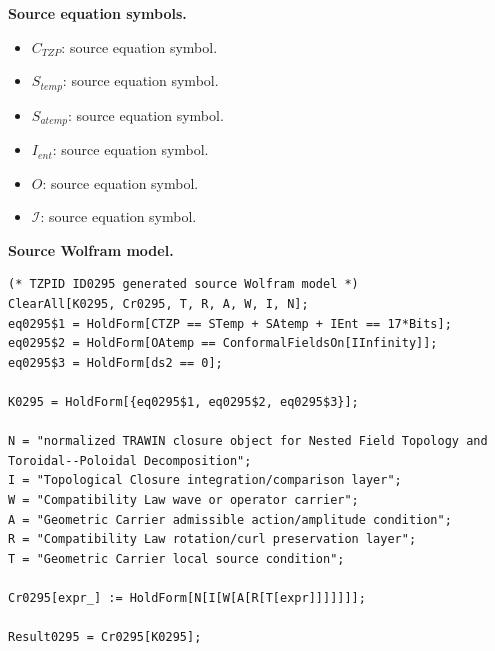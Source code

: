 \begin{minipage}[t]{0.49\linewidth}
\begingroup
\small
\raggedright
\textbf{Source equation symbols.}\par
\begin{itemize}[leftmargin=1.35em,itemsep=1pt,topsep=1pt,parsep=0pt]
    \item $C_{TZP}$: source equation symbol.
    \item $S_{temp}$: source equation symbol.
    \item $S_{atemp}$: source equation symbol.
    \item $I_{ent}$: source equation symbol.
    \item $O$: source equation symbol.
    \item $\mathcal{I}$: source equation symbol.
\end{itemize}
\endgroup
\end{minipage}\hfill
\begin{minipage}[t]{0.47\linewidth}
\begingroup
\scriptsize
\raggedright
\textbf{Source Wolfram model.}\par
\begin{Verbatim}[fontsize=\tiny,breaklines=true,breakanywhere=true]
(* TZPID ID0295 generated source Wolfram model *)
ClearAll[K0295, Cr0295, T, R, A, W, I, N];
eq0295$1 = HoldForm[CTZP == STemp + SAtemp + IEnt == 17*Bits];
eq0295$2 = HoldForm[OAtemp == ConformalFieldsOn[IInfinity]];
eq0295$3 = HoldForm[ds2 == 0];

K0295 = HoldForm[{eq0295$1, eq0295$2, eq0295$3}];

N = "normalized TRAWIN closure object for Nested Field Topology and Toroidal--Poloidal Decomposition";
I = "Topological Closure integration/comparison layer";
W = "Compatibility Law wave or operator carrier";
A = "Geometric Carrier admissible action/amplitude condition";
R = "Compatibility Law rotation/curl preservation layer";
T = "Geometric Carrier local source condition";

Cr0295[expr_] := HoldForm[N[I[W[A[R[T[expr]]]]]]];

Result0295 = Cr0295[K0295];
\end{Verbatim}
\endgroup
\end{minipage}


